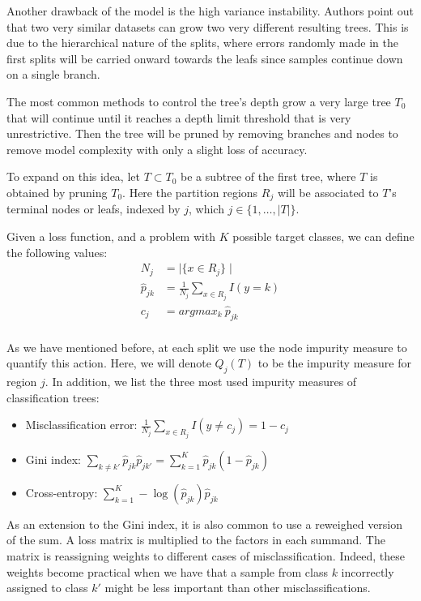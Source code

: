 Another drawback of the model is the high variance instability. Authors point out that two very similar datasets can grow two very different resulting trees. This is due to the hierarchical nature of the splits, where errors randomly made in the first splits will be carried onward towards the leafs since samples continue down on a single branch.

The most common methods to control the tree's depth grow a very large tree $T_0$ that will continue until it reaches a depth limit threshold that is very unrestrictive. Then the tree will be pruned by removing branches and nodes to remove model complexity with only a slight loss of accuracy.

To expand on this idea, let $T \subset T_0$ be a subtree of the first tree, where $T$ is obtained by pruning $T_0$. Here the partition regions $R_j$ will be associated to $T$'s terminal nodes or leafs, indexed by $j$, which $j \in \{1,\ldots,|T| \}$.

Given a loss function, and a problem with $K$ possible target classes, we can define the following values:
\begin{equation}
\begin{split}
N_j & = \mid \{x \in R_j \}\mid \\
\hat{p}_{jk} & = \frac{1}{N_j} \sum_{x \in R_j} I(y=k)\\
c_j & = argmax_{k} \ \hat{p}_{jk} \\
\end{split}
\end{equation}\label{eq:decisionTreePruneParameters}

As we have mentioned before, at each split we use the node impurity measure to quantify this action. Here, we will denote $Q_j(T)$ to be the impurity measure for region $j$. In addition, we list the three most used impurity measures of classification trees:

\begin{itemize}
\item Misclassification error: $ \displaystyle \frac{1}{N_j} \sum_{x \in R_j} I(y\neq c_j) = 1 - c_j $
\item Gini index: $ \displaystyle \sum_{k\neq k'} \hat{p}_{jk} \hat{p}_{jk'}  = \sum_{k=1}^{K} \hat{p}_{jk} (1 - \hat{p}_{jk}) $
\item Cross-entropy: $ \displaystyle \sum_{k=1}^{K} -\log(\hat{p}_{jk})\hat{p}_{jk} $
\end{itemize}


As an extension to the Gini index, it is also common to use a reweighed version of the sum. A loss matrix is multiplied to the factors in each summand. The matrix is reassigning weights to different cases of misclassification. Indeed, these weights become practical when we have that a sample from class $k$ incorrectly assigned to class $k'$ might be less important than other misclassifications.

